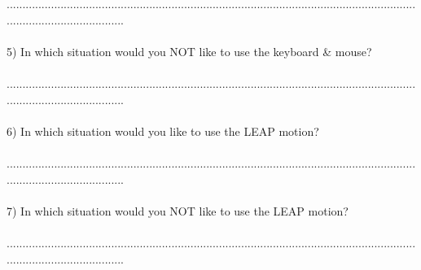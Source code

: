 \begin{appendix}
{......................................................................................................................................................................\\
\\
5) In which situation would you NOT like to use the keyboard \& mouse?\\
\\
......................................................................................................................................................................\\
\\
6) In which situation would you like to use the LEAP motion?\\
\\
......................................................................................................................................................................\\
\\
7) In which situation would you NOT like to use the LEAP motion?\\
\\
......................................................................................................................................................................}

\newpage

\end{appendix}
